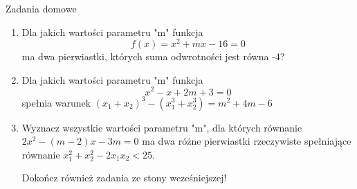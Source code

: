 \documentclass[12pt,a4paper]{article}
\begin{document}
	\newpage
	
	\begin{center}
		\LARGE Zadania domowe
	\end{center}
	\vspace{1.5cm}
	
	\begin{enumerate}[1.]

	\item Dla jakich wartości parametru "m" funkcja
	$$f(x)=x^2+mx-16=0$$
	ma dwa pierwiastki, których suma odwrotności jest równa -4?
	
	\item Dla jakich wartości parametru "m" funkcja
	$$x^2-x+2m+3=0$$
	spełnia warunek $(x_1+x_2)^3-(x_1^3+x_2^3)=m^2+4m-6$
	
	\item Wyznacz wszystkie wartości parametru "m", dla których równanie $2x^2-(m-2)x-3m=0$ ma dwa różne pierwiastki rzeczywiste spełniające równanie $x_1^2+x_2^2-2x_1x_2<25$.
	
	\vspace{2cm}
	\Large Dokończ również zadania ze stony wcześniejszej!
	\end{enumerate}
	
	
	
\end{document}
